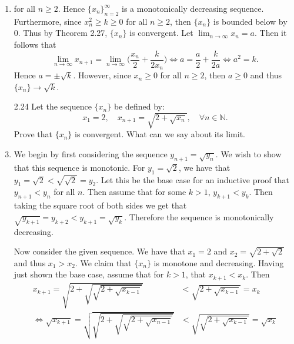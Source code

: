 \documentclass[12pt]{article}
\makeatletter
\theoremstyle{definition}
\theoremstyle{remark}
\renewenvironment{proof}[1][\proofname]{\par
  \pushQED{\qed}%
  \normalfont \topsep6\p@\@plus6\p@\relax
  \list{}{\leftmargin=0mm
          \rightmargin=4mm
          \settowidth{\itemindent}{\itshape#1}%
          \labelwidth=\itemindent
          \parsep=0pt \listparindent=\parindent 
  }
  \item[\hskip\labelsep
        \itshape
    #1\@addpunct{.}]\ignorespaces
}{%
  \popQED\endlist\@endpefalse
}
\let\oldproofname=\proofname
\renewcommand{\proofname}{\bf{\textit{\oldproofname}}}
\makeatother
\begin{document}
\begin{enumerate}[leftmargin=*]
\begin{proof}
                    for all $n\geq 2$. Hence $\{x_n\}_{n=2}^{\infty}$ is a monotonically decreasing sequence. Furthermore, since $x_n^2\geq k\geq 0$ for all $n\geq 2$, then $\{x_n\}$ is bounded below by 0. Thus by Theorem 2.27, $\{x_n\}$ is convergent. Let $\lim_{n\rightarrow\infty}x_n=a$. Then it follows that 
                        \begin{equation*}
                            \lim_{n\rightarrow\infty}x_{n+1}=\lim_{n\rightarrow\infty}\bigg(\frac{x_n}{2}+\frac{k}{2x_n}\bigg)\Leftrightarrow a=\frac{a}{2}+\frac{k}{2a}\Leftrightarrow a^2=k.
                        \end{equation*}
                    Hence $a=\pm\sqrt{k}$. However, since $x_n\geq 0$ for all $n\geq 2$, then $a\geq 0$ and thus $\{x_n\}\rightarrow\sqrt{k}$.
                \end{proof}\newpage
            \item[2.24] Let the sequence $\{x_n\}$ be defined by:
                \begin{equation*}
                    x_1=2,\quad x_{n+1}=\sqrt{2+\sqrt{x_n}},\quad \forall n\in\mathbb{N}.
                \end{equation*}
                Prove that $\{x_n\}$ is convergent. What can we say about its limit.
                \begin{proof}
                    We begin by first considering the sequence $y_{n+1}=\sqrt{y_n}$. We wish to show that this sequence is monotonic. For $y_1=\sqrt{2}$, we have that $y_1=\sqrt{2}<\sqrt{\sqrt{2}}=y_2$. Let this be the base case for an inductive proof that $y_{n+1}<y_n$ for all $n$. Then assume that for some $k>1$, $y_{k+1}<y_k$. Then taking the square root of both sides we get that $\sqrt{y_{k+1}}=y_{k+2}<y_{k+1}=\sqrt{y_k}$. Therefore the sequence is monotonically decreasing.\par\hspace{4mm} Now consider the given sequence. We have that $x_1=2$ and $x_2=\sqrt{2+\sqrt{2}}$ and thus $x_1>x_2$. We claim that $\{x_n\}$ is monotone and decreasing. Having just shown the base case, assume that for $k>1$, that $x_{k+1}<x_k$. Then 
                        \begin{equation*}
                            \begin{split}
                                x_{k+1}=\sqrt{2+\sqrt{\sqrt{2+\sqrt{x_{k-1}}}}}&<\sqrt{2+\sqrt{x_{k-1}}}=x_{k} \\
                                \Leftrightarrow\sqrt{x_{k+1}}=\sqrt{\sqrt{2+\sqrt{\sqrt{2+\sqrt{x_{n-1}}}}}}&<\sqrt{\sqrt{2+\sqrt{x_{k-1}}}}=\sqrt{x_k} \\

\end{split}
\end{equation*}
\end{proof}
\end{enumerate}
\end{document}
